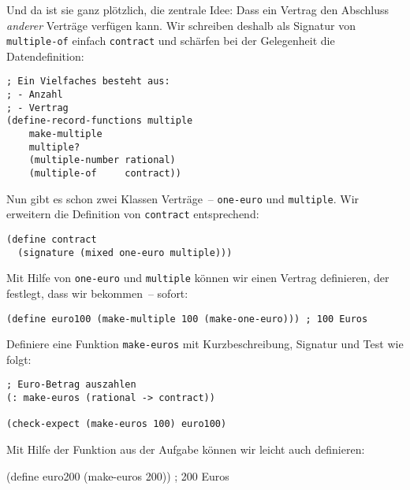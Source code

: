 Und da ist sie ganz plötzlich, die zentrale Idee: Dass ein Vertrag den
Abschluss \emph{anderer} Verträge verfügen kann.  Wir schreiben
deshalb als Signatur von \lstinline{multiple-of} einfach
\lstinline{contract} und schärfen bei der Gelegenheit die Datendefinition:
%
\begin{lstlisting}
; Ein Vielfaches besteht aus:
; - Anzahl
; - Vertrag 
(define-record-functions multiple
    make-multiple
    multiple?
    (multiple-number rational)
    (multiple-of     contract))
\end{lstlisting}
%
Nun gibt es schon zwei Klassen Verträge~-- \lstinline{one-euro} und
\lstinline{multiple}.  Wir erweitern die Definition von
\lstinline{contract} entsprechend:
%
\begin{lstlisting}
(define contract
  (signature (mixed one-euro multiple)))
\end{lstlisting}
%
Mit Hilfe von \lstinline{one-euro} und \lstinline{multiple} können wir
einen Vertrag definieren, der festlegt, dass wir  bekommen~--
sofort:
%
\begin{lstlisting}
(define euro100 (make-multiple 100 (make-one-euro))) ; 100 Euros
\end{lstlisting}
%
\begin{aufgabe}
  Definiere eine Funktion \lstinline{make-euros} mit Kurzbeschreibung,
  Signatur und Test wie folgt:
\begin{lstlisting}
; Euro-Betrag auszahlen
(: make-euros (rational -> contract))

(check-expect (make-euros 100) euro100)
\end{lstlisting}
\end{aufgabe}
%
Mit Hilfe der Funktion aus der Aufgabe können wir leicht auch
 definieren:
%
\begin{lstinline}
(define euro200 (make-euros 200)) ; 200 Euros
\end{lstinline}


